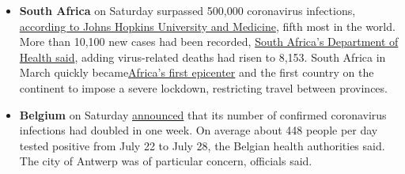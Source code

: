 \begin{itemize}
\item
  \textbf{South Africa} on Saturday surpassed 500,000 coronavirus
  infections, \href{https://coronavirus.jhu.edu/map.html}{according to
  Johns Hopkins University and Medicine}, fifth most in the world. More
  than 10,100 new cases had been recorded,
  \href{https://twitter.com/HealthZA/status/1289655436455510016}{South
  Africa's Department of Health said}, adding virus-related deaths had
  risen to 8,153. South Africa in March quickly
  became\href{https://www.nytimes.com/2020/03/27/world/africa/south-africa-coronavirus.html}{Africa's
  first epicenter} and the first country on the continent to impose a
  severe lockdown, restricting travel between provinces.
\item
  \textbf{Belgium} on Saturday
  \href{https://www.info-coronavirus.be/en/news/the-number-of-confirmed-cases-of-covid-19-has-doubled-in-one-week/}{announced}
  that its number of confirmed coronavirus infections had doubled in one
  week. On average about 448 people per day tested positive from July 22
  to July 28, the Belgian health authorities said. The city of Antwerp
  was of particular concern, officials said.
\end{itemize}

